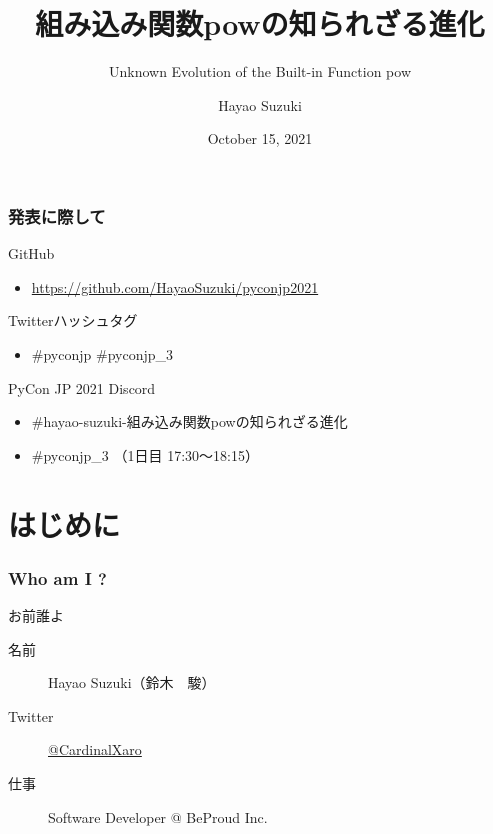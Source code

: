 \documentclass[aspectratio=169,dvipdfmx,14pt,notheorems]{beamer}
\title{組み込み関数powの知られざる進化}
\subtitle{Unknown Evolution of the Built-in Function pow}
\author[Hayao]{Hayao Suzuki}
\institute[PyCon JP 2021]{PyCon JP 2021}
\date{October 15, 2021}
\theoremstyle{definition}
\begin{document}
\begin{frame}[plain]\frametitle{}
\titlepage %
\end{frame}

\begin{frame}\frametitle{発表に際して}

\begin{block}{GitHub}
\begin{itemize}
\item \url{https://github.com/HayaoSuzuki/pyconjp2021}
\end{itemize}
\end{block}

\begin{block}{Twitterハッシュタグ}
\begin{itemize}
\item \#pyconjp \#pyconjp\_3
\end{itemize}
\end{block}

\begin{block}{PyCon JP 2021 Discord}
\begin{itemize}
\item \#hayao-suzuki-組み込み関数powの知られざる進化
\item \#pyconjp\_3 （1日目 17:30～18:15）
\end{itemize}
\end{block}
\end{frame}

\section{はじめに}

\begin{frame}\frametitle{Who am I ?}

\begin{block}{お前誰よ}
\begin{description}
\item[名前] Hayao Suzuki（鈴木　駿）
\item[Twitter] \href{https://twitter.com/CardinalXaro}{@CardinalXaro}
\item[仕事] Software Developer @ BeProud Inc.
\end{description}
\end{block}


\end{frame}
\end{document}
